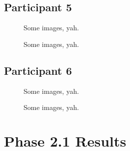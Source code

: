 \subsection{Participant 5}

\clearpage

\begin{figure}[h]
	\caption{Some images, yah.}
\end{figure}

\clearpage

\begin{figure}[h]
	\caption{Some images, yah.}
\end{figure}


\subsection{Participant 6}

\clearpage

\begin{figure}[h]
	\caption{Some images, yah.}
\end{figure}

\clearpage

\begin{figure}[h]
	\caption{Some images, yah.}
\end{figure}


\clearpage

\section{Phase 2.1 Results}

\lipsum[1]

\lipsum[2]

\lipsum[3]


\clearpage

